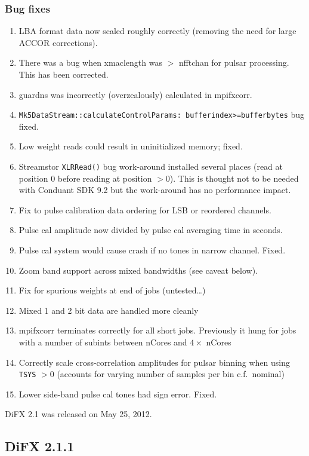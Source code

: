 \subsubsection{Bug fixes}

\begin{enumerate}
\item LBA format data now scaled roughly correctly (removing the need for large ACCOR corrections).
\item There was a bug when xmaclength was $>$ nfftchan for pulsar processing. This has been corrected.
\item guardns was incorrectly (overzealously) calculated in mpifxcorr.
\item {\tt Mk5DataStream::calculateControlParams: bufferindex>=bufferbytes} bug fixed.
\item Low weight reads could result in uninitialized memory; fixed.
\item Streamstor {\tt XLRRead()} bug work-around installed several places (read at position 0 before reading at position $> 0$). This is thought not to be needed with Conduant SDK 9.2 but the work-around has no performance impact.
\item Fix to pulse calibration data ordering for LSB or reordered channels.
\item Pulse cal amplitude now divided by pulse cal averaging time in seconds.
\item Pulse cal system would cause crash if no tones in narrow channel. Fixed.
\item Zoom band support across mixed bandwidths (see caveat below).
\item Fix for spurious weights at end of jobs (untested\ldots)
\item Mixed 1 and 2 bit data are handled more cleanly
\item mpifxcorr terminates correctly for all short jobs.  Previously it hung for jobs with a number of subints between nCores and $4 \times$ nCores
\item Correctly scale cross-correlation amplitudes for pulsar binning when using {\tt TSYS} $>0$ (accounts for varying number of samples per bin c.f.\ nominal)
\item Lower side-band pulse cal tones had sign error.  Fixed.
\end{enumerate}


DiFX 2.1 was released on May 25, 2012.


\subsection{DiFX 2.1.1}

